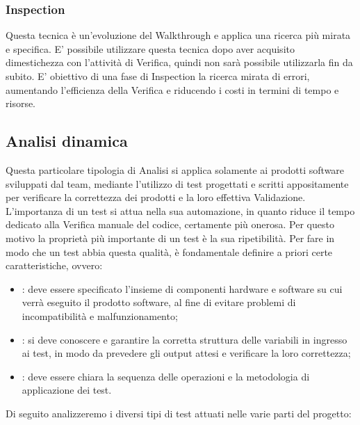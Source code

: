 \subsubsection{Inspection}
\label{3.1.2}
Questa tecnica è un'evoluzione del Walkthrough e applica una ricerca più mirata e specifica. E' possibile utilizzare questa tecnica dopo aver acquisito dimestichezza con l'attività di Verifica, quindi non sarà possibile utilizzarla fin da subito.
E' obiettivo di una fase di Inspection la ricerca mirata di errori, aumentando l'efficienza della Verifica e riducendo i costi in termini di tempo e risorse.

\subsection{Analisi dinamica}
\label{3.2}
Questa particolare tipologia di Analisi si applica solamente ai prodotti software sviluppati dal team, mediante l'utilizzo di test progettati e scritti appositamente per verificare la correttezza dei prodotti e la loro effettiva Validazione.
L'importanza di un test si attua nella sua automazione, in quanto riduce il tempo dedicato alla Verifica manuale del codice, certamente più onerosa. Per questo motivo la proprietà più importante di un test è la sua ripetibilità. 
Per fare in modo che un test abbia questa qualità, è fondamentale definire a priori certe caratteristiche, ovvero:
\begin{itemize}
\item {}: deve essere specificato l'insieme di componenti hardware e software su cui verrà eseguito il prodotto software, al fine di evitare problemi di incompatibilità e malfunzionamento;
\item {}: si deve conoscere e garantire la corretta struttura delle variabili in ingresso ai test, in modo da prevedere gli output attesi e verificare la loro correttezza;
\item {}: deve essere chiara la sequenza delle operazioni e la metodologia di applicazione dei test.
\end{itemize}
Di seguito analizzeremo i diversi tipi di test attuati nelle varie parti del progetto:
